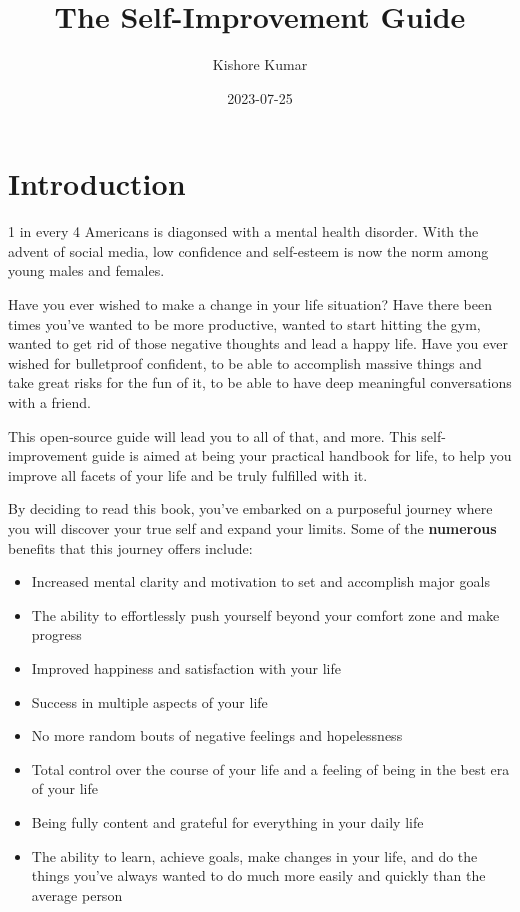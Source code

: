 \documentclass[
]{book}
\title{The Self-Improvement Guide}
\author{Kishore Kumar}
\date{2023-07-25}
\providecommand{\tightlist}{%
  \setlength{\itemsep}{0pt}\setlength{\parskip}{0pt}}
\begin{document}
\maketitle

{
\setcounter{tocdepth}{1}
\tableofcontents
}
\hypertarget{introduction}{%
\chapter{Introduction}\label{introduction}}

1 in every 4 Americans is diagonsed with a mental health disorder. With the advent of social media, low confidence and self-esteem is now the norm among young males and females.

Have you ever wished to make a change in your life situation? Have there been times you've wanted to be more productive, wanted to start hitting the gym, wanted to get rid of those negative thoughts and lead a happy life. Have you ever wished for bulletproof confident, to be able to accomplish massive things and take great risks for the fun of it, to be able to have deep meaningful conversations with a friend.

This open-source guide will lead you to all of that, and more. This self-improvement guide is aimed at being your practical handbook for life, to help you improve all facets of your life and be truly fulfilled with it.

By deciding to read this book, you've embarked on a purposeful journey where you will discover your true self and expand your limits. Some of the \textbf{numerous} benefits that this journey offers include:

\begin{itemize}
\tightlist
\item
  Increased mental clarity and motivation to set and accomplish major goals
\item
  The ability to effortlessly push yourself beyond your comfort zone and make progress
\item
  Improved happiness and satisfaction with your life
\item
  Success in multiple aspects of your life
\item
  No more random bouts of negative feelings and hopelessness
\item
  Total control over the course of your life and a feeling of being in the best era of your life
\item
  Being fully content and grateful for everything in your daily life
\item
  The ability to learn, achieve goals, make changes in your life, and do the things you've always wanted to do much more easily and quickly than the average person
\end{itemize}
\end{document}
